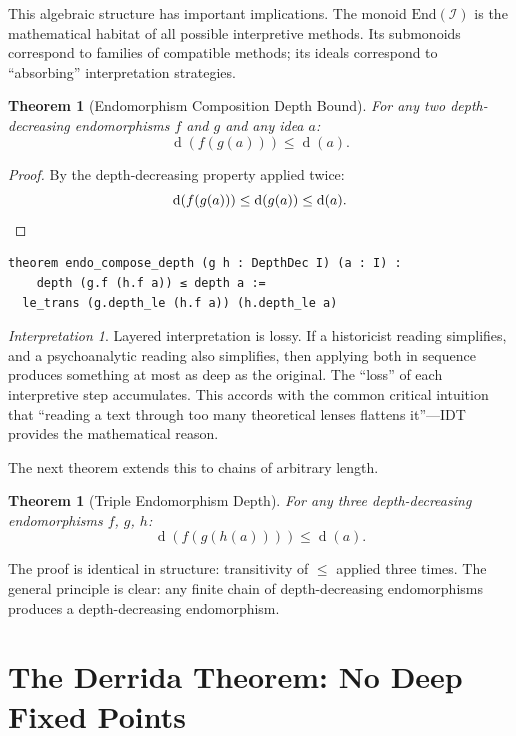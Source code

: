 \documentclass[11pt,openany]{book}
\theoremstyle{definition}
\theoremstyle{plain}
\newtheorem{theorem}[axiom]{Theorem}
\theoremstyle{remark}
\newtheorem{interpretation}[axiom]{Interpretation}
\newcommand{\IS}{\mathcal{I}}               %
\newcommand{\depth}{\operatorname{d}}       %
\begin{document}
This algebraic structure has important implications. The monoid $\mathrm{End}(\IS)$ is the mathematical habitat of all possible interpretive methods. Its submonoids correspond to families of compatible methods; its ideals correspond to ``absorbing'' interpretation strategies.

\begin{theorem}[Endomorphism Composition Depth Bound]
\label{thm:endo-compose-depth}
For any two depth-decreasing endomorphisms $f$ and $g$ and any idea $a$:
\[
\depth(f(g(a))) \leq \depth(a).
\]
\end{theorem}

\begin{proof}
By the depth-decreasing property applied twice:
\[
\depth(f(g(a))) \leq \depth(g(a)) \leq \depth(a). \qedhere
\]
\end{proof}

\begin{lstlisting}[language=Lean4]
theorem endo_compose_depth (g h : DepthDec I) (a : I) :
    depth (g.f (h.f a)) ≤ depth a :=
  le_trans (g.depth_le (h.f a)) (h.depth_le a)
\end{lstlisting}

\begin{interpretation}
Layered interpretation is lossy. If a historicist reading simplifies, and a psychoanalytic reading also simplifies, then applying both in sequence produces something at most as deep as the original. The ``loss'' of each interpretive step accumulates. This accords with the common critical intuition that ``reading a text through too many theoretical lenses flattens it''---IDT provides the mathematical reason.
\end{interpretation}

The next theorem extends this to chains of arbitrary length.

\begin{theorem}[Triple Endomorphism Depth]
For any three depth-decreasing endomorphisms $f$, $g$, $h$:
\[
\depth(f(g(h(a)))) \leq \depth(a).
\]
\end{theorem}

The proof is identical in structure: transitivity of $\leq$ applied three times. The general principle is clear: any finite chain of depth-decreasing endomorphisms produces a depth-decreasing endomorphism.

\section{The Derrida Theorem: No Deep Fixed Points}
\end{document}
